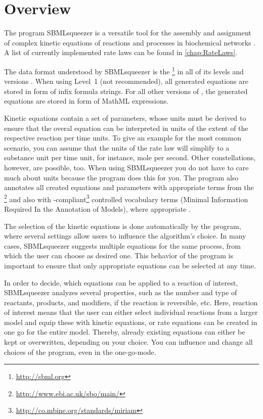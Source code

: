 \chapter{Overview}

The program SBMLsqueezer is a versatile tool for the assembly and assignment of
complex kinetic equations of reactions and processes in biochemical networks
\citep{Draeger2008, Draeger2010a, Draeger2011a}.
A list of currently implemented rate laws can be found in \vref{chap:RateLaws}.

The data format understood by SBMLsqueezer is the
\SBML\footnote{\url{http://sbml.org}} in all of its levels and
versions \citep{Hucka2001, Hucka2003, M.Hucka03012003, Hucka2007, Hucka2008,
Hucka2010a, Finney2003, Finney2006}.
When using \SBML Level~1 (not recommended), all generated equations are stored
in form of infix formula strings. For all other versions of \SBML, the generated
equations are stored in form of MathML \citep{Buswell1999} expressions.

Kinetic equations contain a set of parameters, whose units must be derived to
ensure that the overal equation can be interpreted in units of the extent of the
respective reaction per time units.
To give an example for the most common scenario, you can assume that the units
of the rate law will simplify to a substance unit per time unit, for instance,
mole per second.
Other constellations, however, are possible, too.
When using SBMLsqueezer you do not have to care much about units because the
program does this for you.
The program also annotates all created equations and parameters with appropriate
terms from the \SBO\footnote{\url{http://www.ebi.ac.uk/sbo/main/}} and also
with \MIRIAM-compliant\footnote{\url{http://co.mbine.org/standards/miriam}}
controlled vocabulary terms (Minimal Information Required In the Annotation of
Models), where appropriate \citep{Le2005, Novere2006b, Laible2007, Courtot2011}.

The selection of the kinetic equations is done automatically by the program,
where several settings allow users to influence the algorithm's choice.
In many cases, SBMLsqueezer suggests multiple equations for the same process,
from which the user can choose as desired one.
This behavior of the program is important to ensure that only appropriate
equations can be selected at any time.

In order to decide, which equations can be applied to a reaction of interest,
SBMLsqueezer analyzes several properties, such as the number and type of
reactants, products, and modifiers, if the reaction is reversible, etc.
Here, reaction of interest means that the user can either select individual
reactions from a larger model and equip these with kinetic equations, or rate
equations can be created in one go for the entire model.
Thereby, already existing equations can either be kept or overwritten, depending
on your choice.
You can influence and change all choices of the program, even in the one-go-mode.

